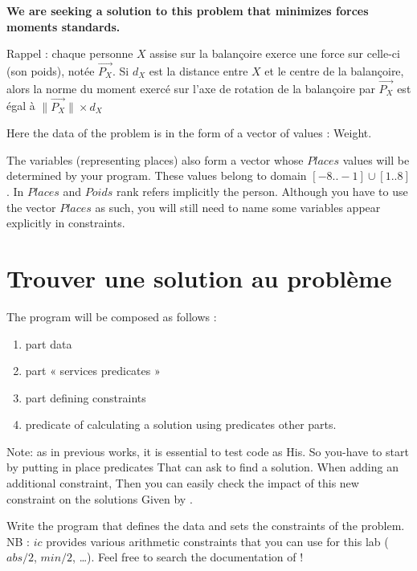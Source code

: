 \textbf{We are seeking a solution to this problem that minimizes forces moments standards.}

\newpage

Rappel : chaque personne $X$ assise sur la balançoire exerce une force sur celle-ci (son poids), notée $\overrightarrow{P_X}$. Si $d_X$ est la distance entre $X$ 
et le centre de la balançoire, alors la norme du moment exercé sur l'axe de rotation de la balançoire par $\overrightarrow{P_X}$ est égal à  $\| \overrightarrow{P_X}\| \times d_X$ 

Here the data of the problem is in the form of a vector of values
: Weight.

The variables (representing places) also form a vector whose $Places$
values will be determined by your program. These values belong to
domain $[-8..-1] \cup [1..8]$. In $Places$ and $Poids$ rank refers implicitly
the person. Although you have to use the vector $Places$ as such, you
will still need to name some variables appear explicitly
in constraints.

\section{Trouver une solution au problème}


\noindent The program will be composed as follows :

\begin{enumerate}
\item part data
\item part « services predicates »
\item part defining constraints
\item predicate of calculating a solution using predicates other parts.
\end{enumerate}

Note: as in previous works, it is essential to test code as His. So you-have to start by putting in place predicates That can ask \eclipse{} to find a solution.
When adding an additional constraint, Then you can easily check the impact of this new constraint on the solutions Given by \eclipse{}.

\begin{question}
Write the program that defines the data and sets the constraints of the problem. NB : $ic$ provides various arithmetic constraints that you can use for this lab ($abs/2$, $min/2$, \ldots). Feel free to search the documentation of \eclipse{}!
\end{question}

